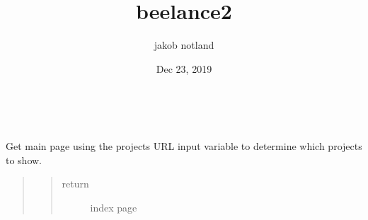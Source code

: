 \documentclass[letterpaper,10pt,english]{sphinxmanual}
\title{beelance2}
\date{Dec 23, 2019}
\author{jakob notland}
\begin{document}
\pagestyle{empty}
\sphinxmaketitle
\pagestyle{plain}
\sphinxtableofcontents
\pagestyle{normal}
\label{\detokenize{index::doc}}


\begin{fulllineitems}
\label{\detokenize{index:views.index.Index}}~

\begin{fulllineitems}
\label{\detokenize{index:views.index.Index.GET}}
Get main page using the projects URL input variable to
determine which projects to show.
\begin{quote}
\begin{quote}\begin{description}
\item[{return}] \leavevmode
index page

\end{description}\end{quote}
\end{quote}

\end{fulllineitems}


\end{fulllineitems}

\end{document}
